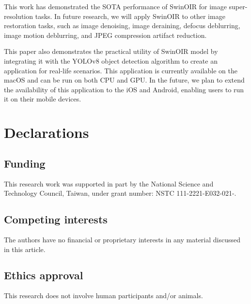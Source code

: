 \documentclass[default,iicol]{sn-jnl}
\theoremstyle{thmstyleone}\newtheorem{theorem}{Theorem}\newtheorem{proposition}[theorem]{Proposition}
\theoremstyle{thmstyletwo}\newtheorem{example}{Example}\newtheorem{remark}{Remark}\theoremstyle{thmstylethree}\newtheorem{definition}{Definition}
\begin{document}
This work has demonstrated the SOTA performance of SwinOIR for image super-resolution tasks. In future research, we will apply SwinOIR to other image restoration tasks, such as image denoising, image deraining, defocus deblurring, image motion deblurring, and JPEG compression artifact reduction.

This paper also demonstrates the practical utility of SwinOIR model by integrating it with the YOLOv8 object detection algorithm to create an application for real-life scenarios. This application is currently available on the macOS and can be run on both CPU and GPU. In the future, we plan to extend the availability of this application to the iOS and Android, enabling users to run it on their mobile devices.

\section{Declarations}
\subsection{Funding}
This research work was supported in part by the National Science and Technology Council, Taiwan, under grant number: NSTC 111-2221-E032-021-.

\subsection{Competing interests}
The authors have no financial or proprietary interests in any material discussed in this article.

\subsection{Ethics approval}
This research does not involve human participants and/or animals.



\end{document}
